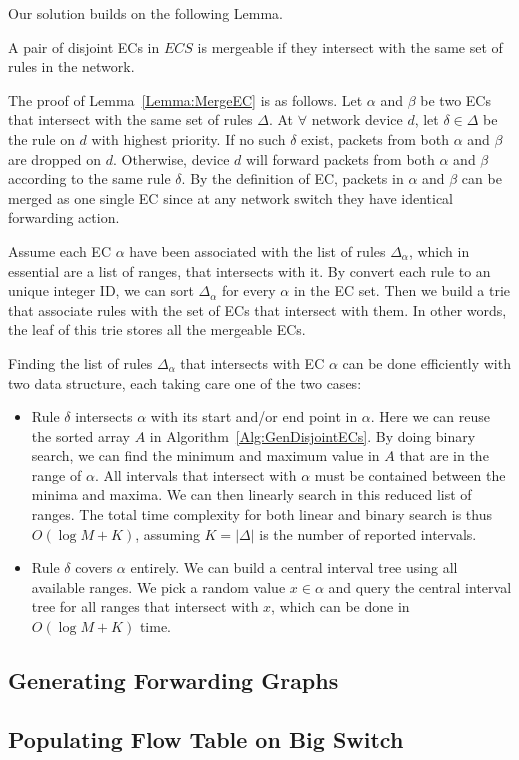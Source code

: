 Our solution builds on the following Lemma.
\begin{lemma}
A pair of disjoint ECs in $ECS$ is mergeable if they intersect with the
same set of rules in the network.
\label{Lemma:MergeEC}
\end{lemma}
The proof of Lemma~\ref{Lemma:MergeEC} is as follows.
Let $\alpha$ and $\beta$ be two ECs that intersect with the same set of rules $\Delta$.
At $\forall$ network device $d$, let $\delta \in \Delta$ be the rule on $d$ with
highest priority.
If no such $\delta$ exist, packets from both $\alpha$ and $\beta$ are dropped on $d$.
Otherwise, device $d$ will forward packets from both $\alpha$ and $\beta$ according to the same
rule $\delta$.
By the definition of EC, packets in $\alpha$ and $\beta$ can be merged as one single EC
since at any network switch they have identical forwarding action.

Assume each EC $\alpha$ have been associated with the list of rules $\Delta_\alpha$,
which in essential are a list of ranges, that intersects with it.
By convert each rule to an unique integer ID, we can sort $\Delta_\alpha$
for every $\alpha$ in the EC set.
Then we build a trie that associate rules with the set of ECs that intersect with them.
In other words, the leaf of this trie stores all the mergeable ECs.

Finding the list of rules $\Delta_\alpha$ that intersects with EC $\alpha$ can be done
efficiently with two data structure,
each taking care one of the two cases\cite{FindIntersectionWiki}:
\begin{itemize}
\item Rule $\delta$ intersects $\alpha$ with its start and/or end point in $\alpha$.
        Here we can reuse the sorted array $A$ in Algorithm~\ref{Alg:GenDisjointECs}.
        By doing binary search, we can find the minimum and maximum value in $A$ that
        are in the range of $\alpha$. All intervals that intersect with $\alpha$ must be
        contained between the minima and maxima. We can then linearly search
        in this reduced list of ranges. The total time complexity for both linear and binary
        search is thus $O(\log M + K)$,
        assuming $K=|\Delta|$ is the number of reported intervals.
\item Rule $\delta$ covers $\alpha$ entirely. We can build
        a central interval tree\cite{ComputationalGeometryBook} using all available ranges.
        We pick a random value $x \in \alpha$ and query the central interval tree for
        all ranges that intersect with $x$, which can be done in $O(\log M + K)$ time.
\end{itemize}


\subsection{Generating Forwarding Graphs}

\subsection{Populating Flow Table on Big Switch}




